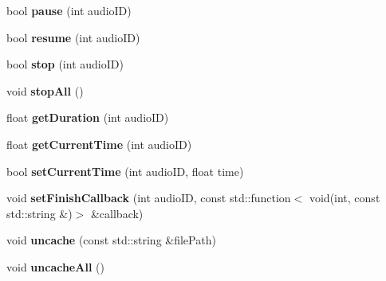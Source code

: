 \begin{DoxyCompactItemize}
bool {\bfseries pause} (int audio\+ID)
\item 
\mbox{\label{classexperimental_1_1AudioEngineImpl_a300f339e4c5178c84522fe8654898e43}} 
bool {\bfseries resume} (int audio\+ID)
\item 
\mbox{\label{classexperimental_1_1AudioEngineImpl_a811786e91bb552443b011659e35483bb}} 
bool {\bfseries stop} (int audio\+ID)
\item 
\mbox{\label{classexperimental_1_1AudioEngineImpl_abcf87e42d6015ae5a0760ce815fb6f28}} 
void {\bfseries stop\+All} ()
\item 
\mbox{\label{classexperimental_1_1AudioEngineImpl_a12fa2f700f4d6e4effc72e1ad7e030cb}} 
float {\bfseries get\+Duration} (int audio\+ID)
\item 
\mbox{\label{classexperimental_1_1AudioEngineImpl_a47be5365efeebd307e3891f3f71386f0}} 
float {\bfseries get\+Current\+Time} (int audio\+ID)
\item 
\mbox{\label{classexperimental_1_1AudioEngineImpl_a8abd3b8330fb7ca7f513016055333f9c}} 
bool {\bfseries set\+Current\+Time} (int audio\+ID, float time)
\item 
\mbox{\label{classexperimental_1_1AudioEngineImpl_ab4bc0ee1754fda9638d7d0c4470cf170}} 
void {\bfseries set\+Finish\+Callback} (int audio\+ID, const std\+::function$<$ void(int, const std\+::string \&)$>$ \&callback)
\item 
\mbox{\label{classexperimental_1_1AudioEngineImpl_a4ad8d3d499bf3e5fd262d710b215891e}} 
void {\bfseries uncache} (const std\+::string \&file\+Path)
\item 
\mbox{\label{classexperimental_1_1AudioEngineImpl_ae439dacc5acebf311686ebf6f1f6b3df}} 
void {\bfseries uncache\+All} ()
\item 
\mbox{\label{classexperimental_1_1AudioEngineImpl_a220cb2755bcaa7d4ae17e2740a9abf8c}} 

\end{DoxyCompactItemize}
